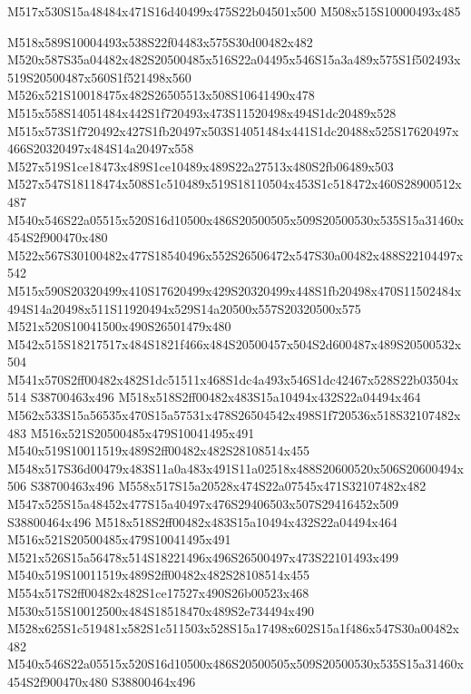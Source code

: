 \documentclass{article}
\begin{document}
\begin{multicols}{2}


\begin{center}
M517x530S15a48484x471S16d40499x475S22b04501x500 M508x515S10000493x485 
\end{center}


M518x589S10004493x538S22f04483x575S30d00482x482 M520x587S35a04482x482S20500485x516S22a04495x546S15a3a489x575S1f502493x519S20500487x560S1f521498x560 M526x521S10018475x482S26505513x508S10641490x478 M515x558S14051484x442S1f720493x473S11520498x494S1dc20489x528 M515x573S1f720492x427S1fb20497x503S14051484x441S1dc20488x525S17620497x466S20320497x484S14a20497x558 M527x519S1ce18473x489S1ce10489x489S22a27513x480S2fb06489x503 M527x547S18118474x508S1c510489x519S18110504x453S1c518472x460S28900512x487 M540x546S22a05515x520S16d10500x486S20500505x509S20500530x535S15a31460x454S2f900470x480 M522x567S30100482x477S18540496x552S26506472x547S30a00482x488S22104497x542 M515x590S20320499x410S17620499x429S20320499x448S1fb20498x470S11502484x494S14a20498x511S11920494x529S14a20500x557S20320500x575 M521x520S10041500x490S26501479x480 M542x515S18217517x484S1821f466x484S20500457x504S2d600487x489S20500532x504 M541x570S2ff00482x482S1dc51511x468S1dc4a493x546S1dc42467x528S22b03504x514 S38700463x496 M518x518S2ff00482x483S15a10494x432S22a04494x464 M562x533S15a56535x470S15a57531x478S26504542x498S1f720536x518S32107482x483 M516x521S20500485x479S10041495x491 M540x519S10011519x489S2ff00482x482S28108514x455 M548x517S36d00479x483S11a0a483x491S11a02518x488S20600520x506S20600494x506 S38700463x496 M558x517S15a20528x474S22a07545x471S32107482x482 M547x525S15a48452x477S15a40497x476S29406503x507S29416452x509 S38800464x496 M518x518S2ff00482x483S15a10494x432S22a04494x464 M516x521S20500485x479S10041495x491 M521x526S15a56478x514S18221496x496S26500497x473S22101493x499 M540x519S10011519x489S2ff00482x482S28108514x455 M554x517S2ff00482x482S1ce17527x490S26b00523x468 M530x515S10012500x484S18518470x489S2e734494x490 M528x625S1c519481x582S1c511503x528S15a17498x602S15a1f486x547S30a00482x482 M540x546S22a05515x520S16d10500x486S20500505x509S20500530x535S15a31460x454S2f900470x480 S38800464x496



\end{multicols}
\end{document}
